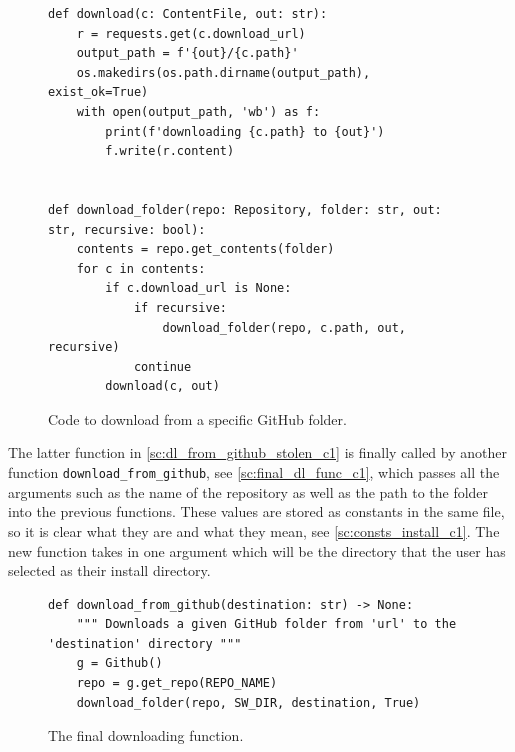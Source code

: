\documentclass[11pt]{article}
\begin{document}
                
                \begin{figure}[!ht]
                   \begin{verbatim}
def download(c: ContentFile, out: str):
    r = requests.get(c.download_url)
    output_path = f'{out}/{c.path}'
    os.makedirs(os.path.dirname(output_path), exist_ok=True)
    with open(output_path, 'wb') as f:
        print(f'downloading {c.path} to {out}')
        f.write(r.content)


def download_folder(repo: Repository, folder: str, out: str, recursive: bool):
    contents = repo.get_contents(folder)
    for c in contents:
        if c.download_url is None:
            if recursive:
                download_folder(repo, c.path, out, recursive)
            continue
        download(c, out)
                   \end{verbatim}
                   \caption{Code to download from a specific GitHub folder.}
                   \label{sc:dl_from_github_stolen_c1}
                \end{figure}


                The latter function in \autoref{sc:dl_from_github_stolen_c1} is finally called by another function \verb|download_from_github|, see \autoref{sc:final_dl_func_c1}, which passes all the arguments such as the name of the repository as well as the path to the folder into the previous functions. These values are stored as constants in the same file, so it is clear what they are and what they mean, see \autoref{sc:consts_install_c1}. The new function takes in one argument which will be the directory that the user has selected as their install directory. 

                \begin{figure}[!ht]
                   \begin{verbatim}
def download_from_github(destination: str) -> None:
    """ Downloads a given GitHub folder from 'url' to the 'destination' directory """
    g = Github()
    repo = g.get_repo(REPO_NAME)
    download_folder(repo, SW_DIR, destination, True)
                   \end{verbatim}
                   \caption{The final downloading function.}
                   \label{sc:final_dl_func_c1}
                \end{figure}
\end{document}
